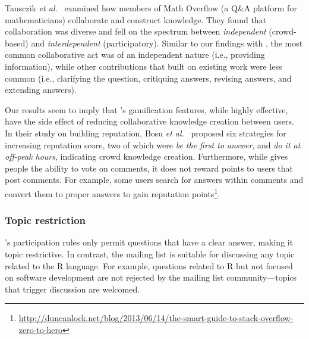 Tausczik \textit{et al.}~\cite{Tausczik2014} examined how members of Math Overflow (a Q\&A platform for mathematicians) collaborate and construct knowledge. They found that collaboration was diverse and fell on the spectrum between \textit{independent} (crowd-based) and \textit{interdependent} (participatory). Similar to our findings with \SO, the most common collaborative act was of an independent nature (i.e., providing information), while other contributions that built on existing work were less common (i.e., clarifying the question, critiquing answers, revising answers, and extending answers).

Our results seem to imply that \SO's gamification features, while highly effective, have the side effect of reducing collaborative knowledge creation between users. In their study on building \SO reputation, Bosu \textit{et al.}~\cite{Bosu2013} proposed six strategies for increasing reputation score, two of which were \textit{be the first to answer}, and \textit{do it at off-peak hours}, indicating crowd knowledge creation. Furthermore, while \SO gives people the ability to vote on comments, it does not reward points to users that post comments. For example, some users search \SO for answers within comments and convert them to proper answers to gain reputation points\footnote{\url{http://duncanlock.net/blog/2013/06/14/the-smart-guide-to-stack-overflow-zero-to-hero}}.



\subsubsection{Topic restriction}

\SO's participation rules only permit questions that have a clear answer, making it topic restrictive. In contrast, the \RH mailing list is suitable for discussing
any topic related to the R language. For example, questions related to R but not focused on software development are not rejected by the \RH mailing list community---topics that trigger discussion are welcomed.

